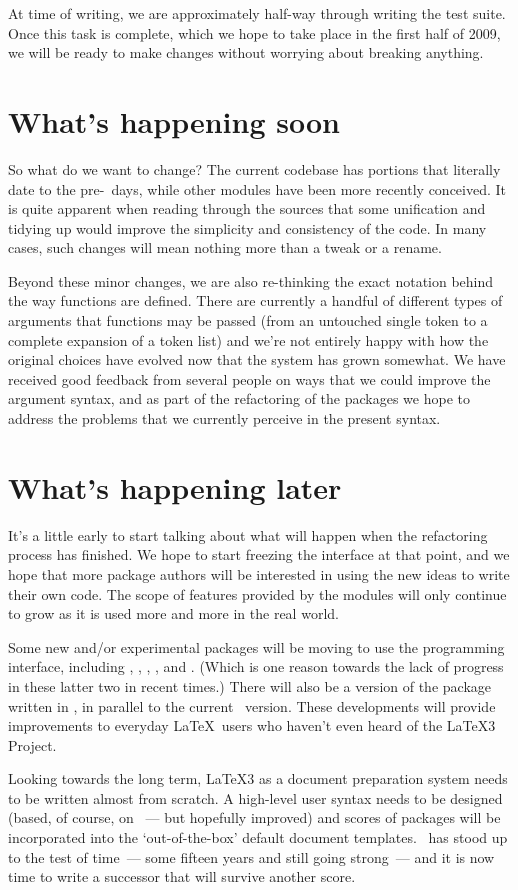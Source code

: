 \documentclass{ltnews}
\begin{document}
At time of writing, we are approximately half-way through writing the test
suite. Once this task is complete, which we hope to take place in the first
half of 2009, we will be ready to make changes without worrying about breaking
anything.

\section{What's happening soon}

So what do we want to change? The current  codebase has
portions that literally date to the pre-\LaTeXe\ days, while other modules
have been more recently conceived. It is quite apparent when reading through
the sources that some unification and tidying up would improve the simplicity
and consistency of the code. In many cases, such changes will mean nothing
more than a tweak or a rename.

Beyond these minor changes, we are also re-thinking the exact notation behind
the way functions are defined. There are currently a handful of different
types of arguments that functions may be passed (from an untouched single
token to a complete expansion of a token list) and we're not entirely happy
with how the original choices have evolved now that the system has grown
somewhat. We have received good feedback from several people on ways that we
could improve the argument syntax, and as part of the refactoring of the
 packages we hope to address the problems that we currently
perceive in the present syntax.

\section{What's happening later}

It's a little early to start talking about what will happen when the
refactoring process has finished. We hope to start freezing the interface at
that point, and we hope that more package authors will be interested in using
the new ideas to write their own code. The scope of features provided by the
 modules will only continue to grow as it is used more and more
in the real world.

Some new and/or experimental packages will be moving to use the
 programming interface, including ,
, , , and
. (Which is one reason towards the lack of progress in
these latter two in recent times.) There will also be a version of the
 package written in , in parallel to the
current \LaTeXe\ version. These developments will provide improvements to
everyday \LaTeX\ users who haven't even heard of the \LaTeX3 Project.

Looking towards the long term, \LaTeX3 as a document preparation system needs
to be written almost from scratch. A high-level user syntax needs to be
designed (based, of course, on \LaTeXe~--- but hopefully improved) and scores
of packages will be incorporated into the `out-of-the-box' default document
templates. \LaTeXe\ has stood up to the test of time~--- some fifteen years
and still going strong~--- and it is now time to write a successor that will
survive another score.
\end{document}
